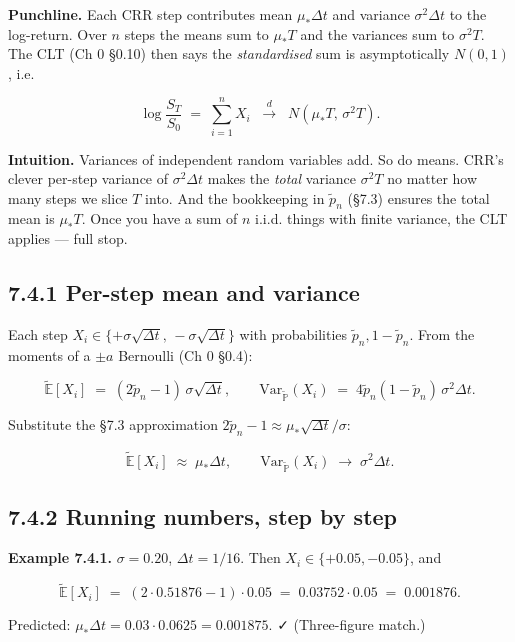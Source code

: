 \documentclass[
  10pt,
  twoside]{book}
\begin{document}
\textbf{Punchline.} Each CRR step contributes mean \(\mu_*\Delta t\) and
variance \(\sigma^2\Delta t\) to the log-return. Over \(n\) steps the
means sum to \(\mu_* T\) and the variances sum to \(\sigma^2 T\). The
CLT (Ch 0 §0.10) then says the \emph{standardised} sum is asymptotically
\(N(0,1)\), i.e.

\[\boxed{\; \log\!\frac{S_T}{S_0} \;=\; \sum_{i=1}^n X_i \;\;\xrightarrow{d}\;\; N(\mu_* T, \,\sigma^2 T). \;}\]

\textbf{Intuition.} Variances of independent random variables add. So do
means. CRR's clever per-step variance of \(\sigma^2\Delta t\) makes the
\emph{total} variance \(\sigma^2 T\) no matter how many steps we slice
\(T\) into. And the bookkeeping in \(\tilde p_n\) (§7.3) ensures the
total mean is \(\mu_* T\). Once you have a sum of \(n\) i.i.d. things
with finite variance, the CLT applies --- full stop.

\subsection{7.4.1 Per-step mean and
variance}\label{per-step-mean-and-variance}

Each step
\(X_i \in \{+\sigma\sqrt{\Delta t},\, -\sigma\sqrt{\Delta t}\}\) with
probabilities \(\tilde p_n, 1-\tilde p_n\). From the moments of a
\(\pm a\) Bernoulli (Ch 0 §0.4):

\[\tilde{\mathbb E}[X_i] \;=\; (2\tilde p_n - 1)\,\sigma\sqrt{\Delta t}, \qquad \mathrm{Var}_{\tilde{\mathbb P}}(X_i) \;=\; 4\tilde p_n(1-\tilde p_n)\,\sigma^2 \Delta t.\]

Substitute the §7.3 approximation
\(2\tilde p_n - 1 \approx \mu_*\sqrt{\Delta t}/\sigma\):

\[\tilde{\mathbb E}[X_i] \;\approx\; \mu_* \Delta t, \qquad \mathrm{Var}_{\tilde{\mathbb P}}(X_i) \;\to\; \sigma^2 \Delta t.\]

\subsection{7.4.2 Running numbers, step by
step}\label{running-numbers-step-by-step}

\textbf{Example 7.4.1.} \(\sigma = 0.20\), \(\Delta t = 1/16\). Then
\(X_i \in \{+0.05, -0.05\}\), and

\[\tilde{\mathbb E}[X_i] \;=\; (2 \cdot 0.51876 - 1) \cdot 0.05 \;=\; 0.03752 \cdot 0.05 \;=\; 0.001876.\]

Predicted: \(\mu_*\Delta t = 0.03 \cdot 0.0625 = 0.001875\). ✓
(Three-figure match.)
\end{document}

